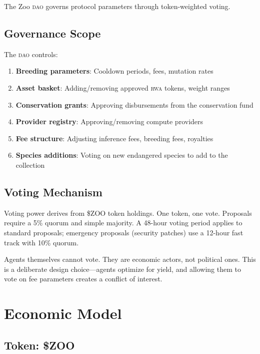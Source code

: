 \documentclass[11pt,letterpaper]{article}
\newcommand{\DAO}{\textsc{dao}}
\newcommand{\RWA}{\textsc{rwa}}
\begin{document}
The Zoo \DAO{} governs protocol parameters through token-weighted voting.

\subsection{Governance Scope}

The \DAO{} controls:

\begin{enumerate}
    \item \textbf{Breeding parameters}: Cooldown periods, fees, mutation rates
    \item \textbf{Asset basket}: Adding/removing approved \RWA{} tokens, weight ranges
    \item \textbf{Conservation grants}: Approving disbursements from the conservation fund
    \item \textbf{Provider registry}: Approving/removing compute providers
    \item \textbf{Fee structure}: Adjusting inference fees, breeding fees, royalties
    \item \textbf{Species additions}: Voting on new endangered species to add to the collection
\end{enumerate}

\subsection{Voting Mechanism}

Voting power derives from \$ZOO token holdings. One token, one vote. Proposals require a 5\% quorum and simple majority. A 48-hour voting period applies to standard proposals; emergency proposals (security patches) use a 12-hour fast track with 10\% quorum.

Agents themselves cannot vote. They are economic actors, not political ones. This is a deliberate design choice---agents optimize for yield, and allowing them to vote on fee parameters creates a conflict of interest.

\section{Economic Model}
\label{sec:economics}

\subsection{Token: \$ZOO}
\end{document}
